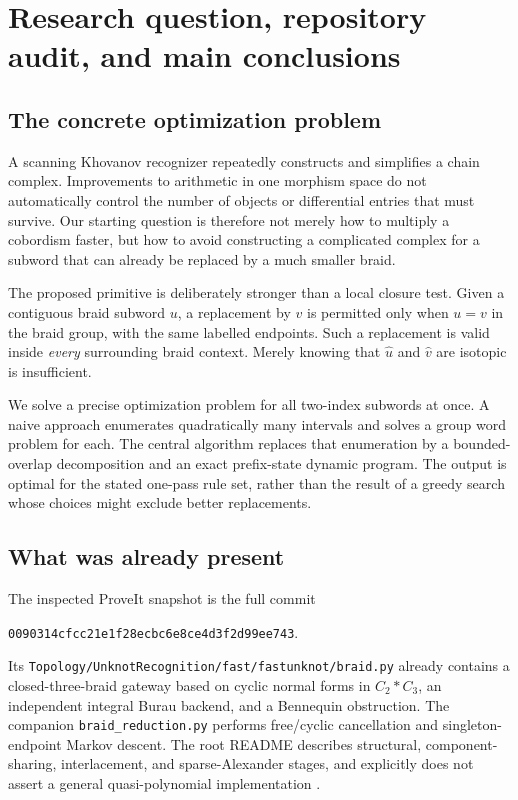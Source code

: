 \documentclass[11pt]{article}
\theoremstyle{definition}
\theoremstyle{remark}
\newcommand{\closure}[1]{\widehat{#1}}
\begin{document}
\section{Research question, repository audit, and main conclusions}
\subsection{The concrete optimization problem}
A scanning Khovanov recognizer repeatedly constructs and simplifies a chain
complex. Improvements to arithmetic in one morphism space do not automatically
control the number of objects or differential entries that must survive. Our
starting question is therefore not merely how to multiply a cobordism faster,
but how to avoid constructing a complicated complex for a subword that can
already be replaced by a much smaller braid.

The proposed primitive is deliberately stronger than a local closure test.
Given a contiguous braid subword $u$, a replacement by $v$ is permitted only
when $u=v$ in the braid group, with the same labelled endpoints. Such a
replacement is valid inside \emph{every} surrounding braid context. Merely
knowing that $\closure u$ and $\closure v$ are isotopic is insufficient.

We solve a precise optimization problem for all two-index subwords at once.
A naive approach enumerates quadratically many intervals and solves a group
word problem for each. The central algorithm replaces that enumeration by a
bounded-overlap decomposition and an exact prefix-state dynamic program. The
output is optimal for the stated one-pass rule set, rather than the result of
a greedy search whose choices might exclude better replacements.

\subsection{What was already present}
The inspected ProveIt snapshot is the full commit
\begin{center}
\texttt{0090314cfcc21e1f28ecbc6e8ce4d3f2d99ee743}.
\end{center}
Its \texttt{Topology/UnknotRecognition/fast/fastunknot/braid.py} already
contains a closed-three-braid gateway based on cyclic normal forms in
$C_2*C_3$, an independent integral Burau backend, and a Bennequin obstruction.
The companion \texttt{braid\_reduction.py} performs free/cyclic cancellation
and singleton-endpoint Markov descent. The root README describes structural,
component-sharing, interlacement, and sparse-Alexander stages, and explicitly
does not assert a general quasi-polynomial implementation \cite{repo}.
\end{document}
